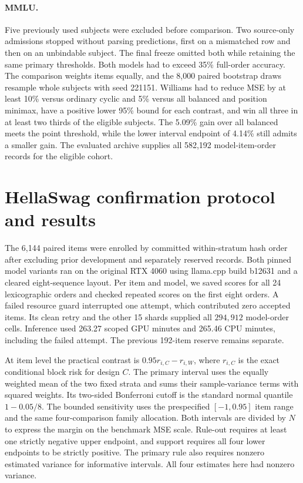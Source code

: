 \paragraph{MMLU.}
Five previously used subjects were excluded before comparison. Two
source-only admissions stopped without parsing predictions, first on a
mismatched row and then on an unbindable subject. The final freeze
omitted both while retaining the same primary thresholds. Both models had to exceed 35\% full-order accuracy. The
comparison weights items equally, and the 8,000 paired bootstrap draws
resample whole subjects with seed 221151. Williams had to reduce MSE by at least 10\% versus ordinary
cyclic and 5\% versus all balanced and position minimax, have a positive
lower 95\% bound for each contrast, and win all three in at least two
thirds of the eligible subjects. The 5.09\% gain over all balanced meets
the point threshold, while the lower interval endpoint of 4.14\% still
admits a smaller gain. The evaluated archive supplies all 582,192
model-item-order records for the eligible cohort.

\section{HellaSwag confirmation protocol and results}
\label{app:hellaswag}
The 6,144 paired items were enrolled by committed within-stratum hash
order after excluding prior development and separately reserved records.
Both pinned model variants ran on the original RTX 4060 using llama.cpp
build b12631 and a cleared eight-sequence layout. Per item and model,
we saved scores for all 24 lexicographic orders and checked repeated
scores on the first eight orders. A failed resource guard interrupted
one attempt, which contributed zero accepted items. Its clean retry
and the other 15 shards supplied all \(294{,}912\) model-order cells.
Inference used 263.27 scoped GPU minutes and 265.46 CPU minutes, including
the failed attempt. The previous 192-item reserve remains separate.

At item level the practical contrast is \(0.95r_{i,C}-r_{i,W}\),
where \(r_{i,C}\) is the exact conditional block risk for design \(C\).
The primary interval uses the equally weighted mean of the two fixed
strata and sums their sample-variance terms with squared weights. Its
two-sided Bonferroni cutoff is the standard normal quantile
\(1-0.05/8\). The bounded sensitivity uses the prespecified
\([-1,0.95]\) item range and the same four-comparison family allocation.
Both intervals are divided by \(N\) to express the margin on the
benchmark MSE scale. Rule-out requires at least one strictly negative
upper endpoint, and support requires all four lower endpoints to be
strictly positive. The primary rule also requires nonzero estimated
variance for informative intervals. All four estimates here had
nonzero variance.

